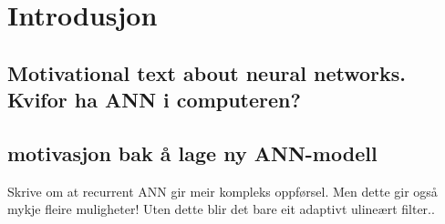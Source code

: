 
\section{Introdusjon}
\subsection{Motivational text about neural networks. Kvifor ha ANN i computeren?}

\subsection{motivasjon bak å lage ny ANN-modell}


Skrive om at recurrent ANN gir meir kompleks oppførsel. Men dette gir også mykje fleire muligheter! Uten dette blir det bare eit adaptivt ulineært filter..

